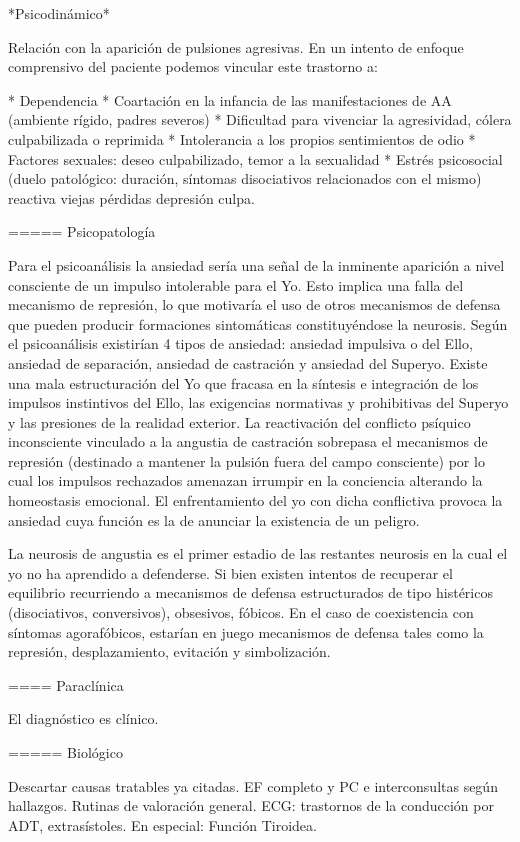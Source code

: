 \documentclass{scrbook}
\begin{document}
*Psicodinámico*

Relación con la aparición de pulsiones agresivas. En un intento de enfoque comprensivo del paciente podemos vincular este trastorno a:

* Dependencia
* Coartación en la infancia de las manifestaciones de AA (ambiente rígido, padres severos)
* Dificultad para vivenciar la agresividad, cólera culpabilizada o reprimida
* Intolerancia a los propios sentimientos de odio
* Factores sexuales: deseo culpabilizado, temor a la sexualidad
* Estrés psicosocial (duelo patológico: duración, síntomas disociativos relacionados con el mismo) reactiva viejas pérdidas depresión culpa.

===== Psicopatología

Para el psicoanálisis la ansiedad sería una señal de la inminente aparición a nivel consciente de un impulso intolerable para el Yo. Esto implica una falla del mecanismo de represión, lo que motivaría el uso de otros mecanismos de defensa que pueden producir formaciones sintomáticas constituyéndose la neurosis. Según el psicoanálisis existirían 4 tipos de ansiedad: ansiedad impulsiva o del Ello, ansiedad de separación, ansiedad de castración y ansiedad del Superyo. Existe una mala estructuración del Yo que fracasa en la síntesis e integración de los impulsos instintivos del Ello, las exigencias normativas y prohibitivas del Superyo y las presiones de la realidad exterior. La reactivación del conflicto psíquico inconsciente vinculado a la angustia de castración sobrepasa el mecanismos de represión (destinado a mantener la pulsión fuera del campo consciente) por lo cual los impulsos rechazados amenazan irrumpir en la conciencia alterando la homeostasis emocional. El enfrentamiento del yo con dicha conflictiva provoca la ansiedad cuya función es la de anunciar la existencia de un peligro. 

La neurosis de angustia es el primer estadio de las restantes neurosis en la cual el yo no ha aprendido a defenderse. Si bien existen intentos de recuperar el equilibrio recurriendo a mecanismos de defensa estructurados de tipo histéricos (disociativos, conversivos), obsesivos, fóbicos. En el caso de coexistencia con síntomas agorafóbicos, estarían en juego mecanismos de defensa tales como la represión, desplazamiento, evitación y simbolización.

==== Paraclínica

El diagnóstico es clínico.

===== Biológico

Descartar causas tratables ya citadas. EF completo y PC e interconsultas según hallazgos. Rutinas de valoración general. ECG: trastornos de la conducción por ADT, extrasístoles. En especial: Función Tiroidea.
\end{document}
